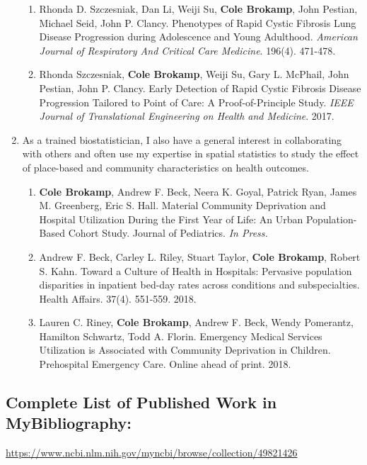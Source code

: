 \documentclass{nihbiosketch}
\begin{document}
\begin{enumerate}
\begin{enumerate}
	\item Rhonda D. Szczesniak, Dan Li, Weiji Su, \textbf{Cole Brokamp}, John Pestian, Michael Seid, John P. Clancy. Phenotypes of Rapid Cystic Fibrosis Lung Disease Progression during Adolescence and Young Adulthood. \textit{American Journal of Respiratory And Critical Care Medicine}. 196(4). 471-478.
	
	\item Rhonda Szczesniak, \textbf{Cole Brokamp}, Weiji Su, Gary L. McPhail,
	John Pestian, John P. Clancy. Early Detection of Rapid Cystic Fibrosis
	Disease Progression Tailored to Point of Care: A Proof-of-Principle
	Study. \textit{IEEE Journal of Translational Engineering on Health and Medicine}. 2017.

\end{enumerate}

\item As a trained biostatistician, I also have a general interest in collaborating with others and often use my expertise in spatial statistics to study the effect of place-based and community characteristics on health outcomes.

\begin{enumerate}

	\item \textbf{Cole Brokamp}, Andrew F. Beck, Neera K. Goyal, Patrick Ryan, James M. Greenberg, Eric S. Hall. Material Community Deprivation and Hospital Utilization During the First Year of Life: An Urban Population-Based Cohort Study. Journal of Pediatrics. \textit{In Press.}
	
	\item Andrew F. Beck, Carley L. Riley, Stuart Taylor, \textbf{Cole Brokamp}, Robert S. Kahn. Toward a Culture of Health in Hospitals: Pervasive population disparities in inpatient bed-day rates across conditions and subspecialties. Health Affairs. 37(4). 551-559. 2018.
		
	\item Lauren C. Riney, \textbf{Cole Brokamp}, Andrew F. Beck, Wendy Pomerantz, Hamilton Schwartz, Todd A. Florin. Emergency Medical Services Utilization is Associated with Community Deprivation in Children. Prehospital Emergency Care. Online ahead of print. 2018.


\end{enumerate}

\end{enumerate}

\subsection*{Complete List of Published Work in MyBibliography:} 
\url{https://www.ncbi.nlm.nih.gov/myncbi/browse/collection/49821426}
\end{document}
